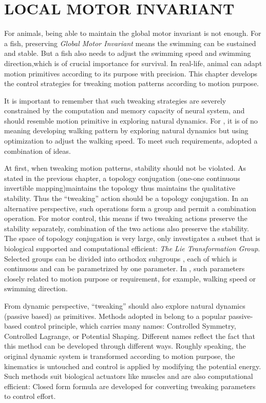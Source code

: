 \chapter{LOCAL MOTOR INVARIANT}
\label{chap:li}

\graphicspath{{LocalInvariant/LocalInvariantFigs/EPS/}{LocalInvariant/LocalInvariantFigs/}}
For animals,  being able to maintain the global motor invariant is not enough.
For a fish, preserving \emph{Global Motor Invariant}  means the swimming can be sustained and stable.
But a fish also needs to adjust the swimming speed and swimming direction,which is of crucial importance for survival.
In real-life, animal can adapt motion primitives according to its purpose with precision.
This chapter develops the control strategies for tweaking motion patterns according to motion purpose.

It is important to remember that such tweaking strategies are severely constrained by the computation and memory capacity of neural system,  and should resemble  motion primitive in exploring natural dynamics.
For \cms, it is of no meaning developing walking pattern by exploring natural dynamics but using optimization to adjust the walking speed. To meet such requirements, \moit adopted a combination of ideas.

At first, when tweaking motion patterns, stability should not be violated. 
As stated in the previous chapter, a topology conjugation (one-one continuous invertible mapping)maintains the topology thus maintains the qualitative stability. Thus the ``tweaking'' action should be a topology conjugation. In an alternative perspective, such operations form a group and permit a combination operation. 
For motor control, this means if two tweaking actions preserve the stability separately, combination of the two actions also preserve the stability.
The space of topology conjugation is very large, \moit only investigates a subset that is biological supported and computational efficient: \emph{The Lie Transformation Group}.
Selected groups can be divided into orthodox subgroups , each of which is continuous and can be parametrized by one parameter.
In \cms, such parameters closely related to motion purpose or requirement, for example, walking speed or swimming direction.

From dynamic perspective, ``tweaking''  should also explore natural dynamics (passive based) as primitives.
Methods adopted in \moit belong to  a popular passive-based control principle, which carries many names: Controlled Symmetry, Controlled Lagrange, or Potential Shaping.
Different names reflect the fact that this method can be developed through different ways.
Roughly speaking, the original dynamic system is transformed according to motion purpose, the kinematics is untouched and control is applied by modifying the potential energy.
Such methods suit biological actuators like muscles and are also computational efficient:
Closed form formula are developed for converting tweaking parameters to control effort.

